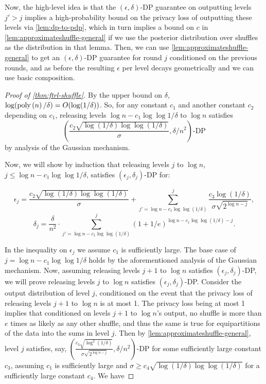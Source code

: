 Now, the high-level idea is that the $(\epsilon, \delta)$-DP guarantee on outputting levels $j' > j$ implies a high-probability bound on the privacy loss of outputting these levels via \cref{lem:dp-to-pdp}, which in turn implies a bound on $c$ in \cref{lem:approximateshuffle-general} if we use the posterior distribution over shuffles as the distribution in that lemma. Then, we can use \cref{lem:approximateshuffle-general} to get an $(\epsilon, \delta)$-DP guarantee for round $j$ conditioned on the previous rounds, and as before the resulting $\epsilon$ per level decays geometrically and we can use basic composition. 

\begin{proof}[Proof of \cref{thm:ftrl-shuffle}]

By the upper bound on $\delta$, $\log({\rm poly}\left(n\right)/\delta) = O(\log(1/\delta))$. So, for any constant $c_1$ and another constant $c_2$ depending on $c_1$, releasing levels $\log n - c_1 \log \log 1/\delta$ to $\log n$ satisfies \[\left(\frac{c_2 \sqrt{\log(1/\delta) \log \log(1/\delta)}}{\sigma}, \delta / n^2\right)\text{-DP}\] by analysis of the Gaussian mechanism.

Now, we will show by induction that releasing levels $j$ to $\log n$, $j \leq \log n - c_1 \log \log 1/\delta$, satisfies $(\epsilon_j, \delta_j)$-DP for:

\[\epsilon_j = \frac{c_2 \sqrt{\log(1/\delta) \log \log(1/\delta)}}{\sigma} + \sum_{j'=\log n - c_1 \log \log (1/\delta)}^{j} \frac{c_3 \log(1/\delta)}{\sigma \sqrt{2^{\log n - j}}}, \]
\[\delta_j = \frac{\delta}{n^2} \cdot \sum_{j'=\log n - c_1 \log \log (1/\delta)}^{j} (1 + 1/e)^{\log n - c_1 \log \log (1/\delta) - j}. \]

In the inequality on $\epsilon_j$ we assume $c_1$ is sufficiently large. The base case of $j = \log n - c_1 \log \log 1/\delta$ holds by the aforementioned analysis of the Gaussian mechanism. 
Now, assuming releasing levels $j+1$ to $\log n$  satisfies $(\epsilon_j, \delta_j)$-DP, we will prove releasing levels $j$ to $\log n$ satisfies $(\epsilon_j, \delta_j)$-DP. Consider the output distribution of level $j$, conditioned on the event that the privacy loss of releasing levels $j+1$ to $\log n$ is at most 1. The privacy loss being at most 1 implies that conditioned on levels $j+1$ to $\log n$'s output, no shuffle is more than $e$ times as likely as any other shuffle, and thus the same is true for equipartitions of the data into the sums in level $j$. 
Then by \cref{lem:approximateshuffle-general}, level $j$ satisfies, say, $(\frac{c_3 \sqrt{\log^2(1/\delta)}}{\sigma \sqrt{2^{\log n - j}}}, \delta / n^2)$-DP for some sufficiently large constant $c_3$, assuming $c_1$ is sufficiently large and $\sigma \geq c_4 \sqrt{\log(1/\delta) \log \log(1/\delta)}$ for a sufficiently large constant $c_4$. We have


\end{proof}
